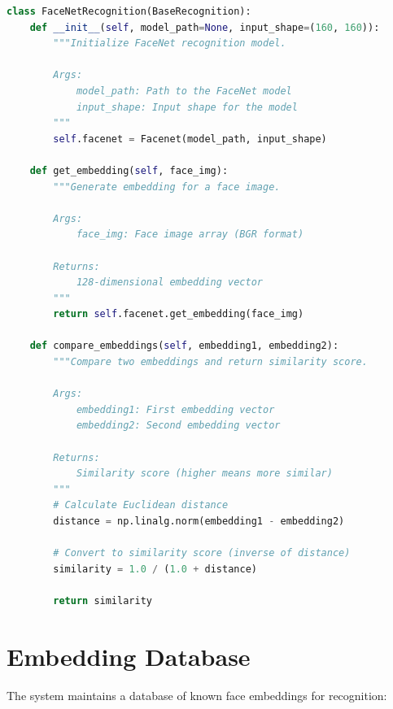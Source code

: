\begin{lstlisting}[language=Python, caption=FaceNet Recognition Implementation]
class FaceNetRecognition(BaseRecognition):
    def __init__(self, model_path=None, input_shape=(160, 160)):
        """Initialize FaceNet recognition model.
        
        Args:
            model_path: Path to the FaceNet model
            input_shape: Input shape for the model
        """
        self.facenet = Facenet(model_path, input_shape)
        
    def get_embedding(self, face_img):
        """Generate embedding for a face image.
        
        Args:
            face_img: Face image array (BGR format)
            
        Returns:
            128-dimensional embedding vector
        """
        return self.facenet.get_embedding(face_img)
    
    def compare_embeddings(self, embedding1, embedding2):
        """Compare two embeddings and return similarity score.
        
        Args:
            embedding1: First embedding vector
            embedding2: Second embedding vector
            
        Returns:
            Similarity score (higher means more similar)
        """
        # Calculate Euclidean distance
        distance = np.linalg.norm(embedding1 - embedding2)
        
        # Convert to similarity score (inverse of distance)
        similarity = 1.0 / (1.0 + distance)
        
        return similarity
\end{lstlisting}

\section{Embedding Database}
The system maintains a database of known face embeddings for recognition:

